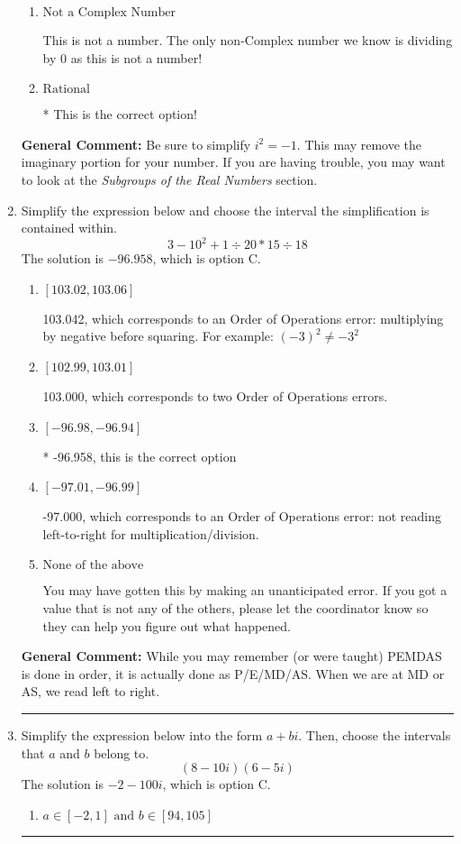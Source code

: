 \documentclass{extbook}[14pt]
\newcommand{\litem}[1]{\item #1

\rule{\textwidth}{0.4pt}}
\begin{document}
\begin{enumerate}
{\begin{enumerate}[label=\Alph*.]
This is a Complex number $(a+bi)$ that is not Real (has $i$ as part of the number).
\item \( \text{Not a Complex Number} \)

This is not a number. The only non-Complex number we know is dividing by 0 as this is not a number!
\item \( \text{Rational} \)

* This is the correct option!
\end{enumerate}

\textbf{General Comment:} Be sure to simplify $i^2 = -1$. This may remove the imaginary portion for your number. If you are having trouble, you may want to look at the \textit{Subgroups of the Real Numbers} section.
}
\litem{
Simplify the expression below and choose the interval the simplification is contained within.
\[ 3 - 10^2 + 1 \div 20 * 15 \div 18 \]The solution is \( -96.958 \), which is option C.\begin{enumerate}[label=\Alph*.]
\item \( [103.02, 103.06] \)

 103.042, which corresponds to an Order of Operations error: multiplying by negative before squaring. For example: $(-3)^2 \neq -3^2$
\item \( [102.99, 103.01] \)

 103.000, which corresponds to two Order of Operations errors.
\item \( [-96.98, -96.94] \)

* -96.958, this is the correct option
\item \( [-97.01, -96.99] \)

 -97.000, which corresponds to an Order of Operations error: not reading left-to-right for multiplication/division.
\item \( \text{None of the above} \)

 You may have gotten this by making an unanticipated error. If you got a value that is not any of the others, please let the coordinator know so they can help you figure out what happened.
\end{enumerate}

\textbf{General Comment:} While you may remember (or were taught) PEMDAS is done in order, it is actually done as P/E/MD/AS. When we are at MD or AS, we read left to right.
}
\litem{
Simplify the expression below into the form $a+bi$. Then, choose the intervals that $a$ and $b$ belong to.
\[ (8 - 10 i)(6 - 5 i) \]The solution is \( -2 - 100 i \), which is option C.\begin{enumerate}[label=\Alph*.]
\item \( a \in [-2, 1] \text{ and } b \in [94, 105] \)


\end{enumerate}}
\end{enumerate}
\end{document}
